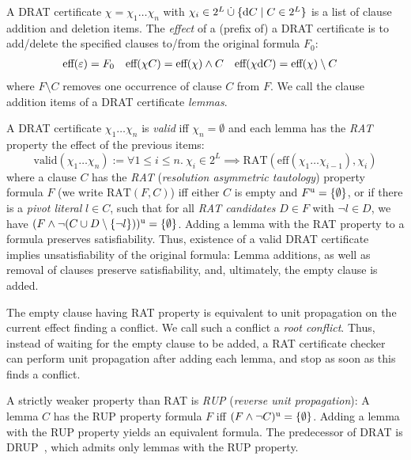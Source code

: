 \documentclass{llncs}
\begin{document}
A DRAT certificate $\chi = \chi_1\ldots\chi_n$ with $\chi_i \in 2^L \mathbin{\dot\cup} \{ \textrm d C \mid C\in 2^L \}$
is a list of clause addition and deletion items.
The \emph{effect} of a (prefix of) a DRAT certificate is to add/delete the specified clauses to/from the original formula $F_0$:
\begin{align*}
  \textrm{eff}(\varepsilon) &= F_0&
  \textrm{eff}(\chi C) &= \textrm{eff}(\chi) \wedge C&
  \textrm{eff}(\chi\textrm d C) &= \textrm{eff}(\chi) \setminus C
\end{align*}
where $F \setminus C$ removes one occurrence of clause $C$ from $F$. %
We call the clause addition items of a DRAT certificate \emph{lemmas}.

A DRAT certificate $\chi_1 \ldots \chi_n$ is \emph{valid} iff $\chi_n=\emptyset$ and each lemma has the \emph{RAT} property \wrt the effect of the previous items:
\[
  \textrm{valid}(\chi_1 \ldots \chi_n) := \forall 1\le i\le n.~\chi_i\in2^L \implies\textrm{RAT}( \textrm{eff}(\chi_1\ldots \chi_{i-1}), \chi_i )
\]
where a clause $C$ has the \emph{RAT} (\emph{resolution asymmetric tautology}) property \wrt formula $F$ (we write $\textrm{RAT}(F,C)$) iff either $C$ is empty and $F^{\textrm u}=\{\emptyset\}$,
or if there is a \emph{pivot literal} $l\in C$, such that for all \emph{RAT candidates} $D\in F$ with $\neg l \in D$, we have $(F \wedge \neg(C \cup D\setminus\{\neg l\}))^{\textrm u} = \{\emptyset\}$.
Adding a lemma with the RAT property to a formula preserves satisfiability. Thus, existence of a valid DRAT certificate implies unsatisfiability of the original formula: Lemma additions, as well as removal of clauses preserve satisfiability, and, ultimately, the empty clause is added.

The empty clause having RAT property is equivalent to unit propagation on the current effect finding a conflict. We call such a conflict a \emph{root conflict}.
Thus, instead of waiting for the empty clause to be added, a RAT certificate checker can perform unit propagation after adding each lemma, 
and stop as soon as this finds a conflict.

A strictly weaker property than RAT is \emph{RUP} (\emph{reverse unit propagation}): A lemma $C$ has the RUP property \wrt formula $F$ iff $(F \wedge \neg C)^{\textrm u} = \{\emptyset\}$.
Adding a lemma with the RUP property yields an equivalent formula. The predecessor of DRAT is DRUP~\cite{HHW13}, which admits only lemmas with the RUP property.
\end{document}
